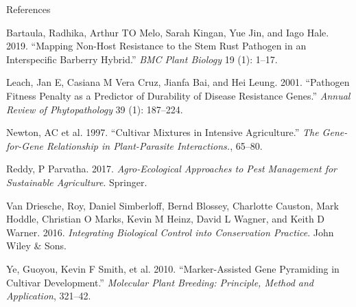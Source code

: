 \documentclass[11pt,dvipsnames,ignorenonframetext,aspectratio=169]{beamer}
\newenvironment{CSLReferences}%
  {}%
  {\par}
\begin{document}
\begin{frame}[allowframebreaks]{References}
\protect\hypertarget{references}{}
\footnotesize

\hypertarget{refs}{}
\begin{CSLReferences}{1}{0}
\leavevmode{}%
Bartaula, Radhika, Arthur TO Melo, Sarah Kingan, Yue Jin, and Iago Hale.
2019. {``Mapping Non-Host Resistance to the Stem Rust Pathogen in an
Interspecific Barberry Hybrid.''} \emph{BMC Plant Biology} 19 (1):
1--17.

\leavevmode{}%
Leach, Jan E, Casiana M Vera Cruz, Jianfa Bai, and Hei Leung. 2001.
{``Pathogen Fitness Penalty as a Predictor of Durability of Disease
Resistance Genes.''} \emph{Annual Review of Phytopathology} 39 (1):
187--224.

\leavevmode{}%
Newton, AC et al. 1997. {``Cultivar Mixtures in Intensive
Agriculture.''} \emph{The Gene-for-Gene Relationship in Plant-Parasite
Interactions.}, 65--80.

\leavevmode{}%
Reddy, P Parvatha. 2017. \emph{Agro-Ecological Approaches to Pest
Management for Sustainable Agriculture}. Springer.

\leavevmode{}%
Van Driesche, Roy, Daniel Simberloff, Bernd Blossey, Charlotte Causton,
Mark Hoddle, Christian O Marks, Kevin M Heinz, David L Wagner, and Keith
D Warner. 2016. \emph{Integrating Biological Control into Conservation
Practice}. John Wiley \& Sons.

\leavevmode{}%
Ye, Guoyou, Kevin F Smith, et al. 2010. {``Marker-Assisted Gene
Pyramiding in Cultivar Development.''} \emph{Molecular Plant Breeding:
Principle, Method and Application}, 321--42.

\end{CSLReferences}
\end{frame}
\end{document}
